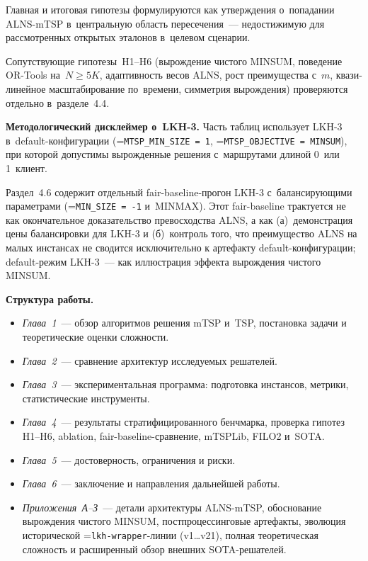 \documentclass[a4paper,14pt]{extreport}
\makeatletter
\let\old@texttt\texttt
\renewcommand{\texttt}[1]{{\sloppy\hyphenchar\font=\m@ne\old@texttt{#1}}}
\makeatother
\begin{document}
\noindent Главная и итоговая гипотезы формулируются как утверждения о~попадании ALNS-mTSP в~центральную область пересечения~--- недостижимую для рассмотренных открытых эталонов в~целевом сценарии.

Сопутствующие гипотезы~H1--H6 (вырождение чистого MINSUM, поведение OR-Tools на~$N \geq 5K$, адаптивность весов ALNS, рост преимущества с~$m$, квази-линейное масштабирование по~времени, симметрия вырождения) проверяются отдельно в~разделе~4.4.

\textbf{Методологический дисклеймер о~LKH-3.} Часть таблиц использует LKH-3 в~default-конфигурации (\texttt{MTSP\_MIN\_SIZE = 1}, \texttt{MTSP\_OBJECTIVE = MINSUM}), при которой допустимы вырожденные решения с~маршрутами длиной 0~или 1~клиент.

Раздел~4.6 содержит отдельный fair-baseline-прогон LKH-3 с~балансирующими параметрами (\texttt{MIN\_SIZE = -1} и~MINMAX). Этот fair-baseline трактуется не как окончательное доказательство превосходства ALNS, а как (а)~демонстрация цены балансировки для LKH-3 и (б)~контроль того, что преимущество ALNS на малых инстансах не сводится исключительно к артефакту default-конфигурации; default-режим LKH-3~--- как иллюстрация эффекта вырождения чистого MINSUM.

\medskip
\textbf{Структура работы.}
\begin{itemize}\setlength\itemsep{1pt}
\item \emph{Глава~1}~--- обзор алгоритмов решения mTSP и~TSP, постановка задачи и теоретические оценки сложности.
\item \emph{Глава~2}~--- сравнение архитектур исследуемых решателей.
\item \emph{Глава~3}~--- экспериментальная программа: подготовка инстансов, метрики, статистические инструменты.
\item \emph{Глава~4}~--- результаты стратифицированного бенчмарка, проверка гипотез H1--H6, ablation, fair-baseline-сравнение, mTSPLib, FILO2 и~SOTA.
\item \emph{Глава~5}~--- достоверность, ограничения и риски.
\item \emph{Глава~6}~--- заключение и направления дальнейшей работы.
\item \emph{Приложения~А--З}~--- детали архитектуры ALNS-mTSP, обоснование вырождения чистого MINSUM, постпроцессинговые артефакты, эволюция исторической \texttt{lkh-wrapper}-линии (v1\dots v21), полная теоретическая сложность и расширенный обзор внешних SOTA-решателей.
\end{itemize}
\end{document}
